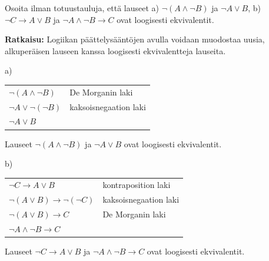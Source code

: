 \begin{esimerkki}
Osoita ilman totuustauluja, että lauseet  a) $\lnot(A \land \lnot B)$  ja  $\lnot A \lor B$,    b)  
$\lnot C\to A \lor B$ ja $\lnot A \land \lnot B \to C$ ovat loogisesti ekvivalentit.

{\bf Ratkaisu:}
Logiikan päättelysääntöjen avulla voidaan muodostaa uusia, alkuperäisen lauseen kanssa loogisesti ekvivalentteja lauseita.

a)

\begin{tabular}{ll}
$\lnot (A \land \lnot B)$ & De Morganin laki \\
$\lnot A \lor \lnot (\lnot B)$ & kaksoisnegaation laki \\
$\lnot A \lor B$ & \\
\end{tabular}

\bigskip

Lauseet $\lnot(A \land \lnot B)$  ja  $\lnot A \lor B$ ovat loogisesti ekvivalentit.

b)

\begin{tabular}{ll}
$\lnot C \to A \lor B$ & kontraposition laki \\
$\lnot (A\lor B)\to \lnot(\lnot C)$ & kaksoisnegaation laki \\
$\lnot (A \lor B) \to C$ & De Morganin laki\\
$\lnot A \land \lnot B \to C$
\end{tabular}

\bigskip

Lauseet $\lnot C\to A \lor B$ ja $\lnot A \land \lnot B \to C$ ovat loogisesti ekvivalentit.

\end{esimerkki}




\Harjoitustehtavat

